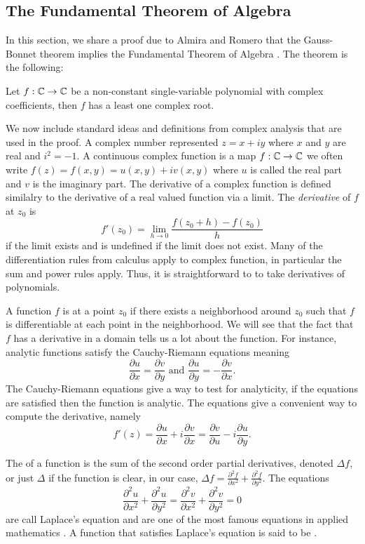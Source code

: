 \subsection{The Fundamental Theorem of Algebra}
\label{sec:fta}

In this section, we share a proof due to Almira and Romero that
the Gauss-Bonnet theorem implies the
Fundamental Theorem of Algebra \cite{almira_yet_2007}.
The theorem is the following:
\begin{theorem}\label{thm:fta}
	Let $f:\mathbb{C} \to \mathbb{C}$ be a non-constant single-variable polynomial with complex coefficients,
	then $f$ has a least one complex root.
\end{theorem}


We now include standard ideas and definitions from complex analysis that are used
in the proof. 
A complex number represented $z=x+iy$ where $x$ and $y$ are real
and $i^2=-1.$
A continuous complex function is a map $f:\mathbb{C}\to \mathbb{C}$ we often write
 $f(z)=f(x,y)=u(x,y)+iv(x,y)$ where $u$ is called the real part and $v$ is the imaginary part.
The derivative of a complex function is defined similalry to the derivative of a real valued
function via a limit. The \emph{derivative} of $f$ at $z_0$ is
$$f'(z_0)=\lim_{h\to 0} \frac{f(z_0+h)-f(z_0)}{h}$$
if the limit exists and is undefined if the limit does not exist.
Many of the differentiation rules from calculus apply to complex function,
in particular the sum and power rules apply. Thus, it is straightforward to 
to take derivatives of polynomials.


A function $f$ is  at a point $z_0$ if there exists a neighborhood around $z_0$ 
such that $f$ is differentiable at each point in the neighborhood.
We will see that the fact that $f$ has a derivative in a domain tells
us a lot about the function. For instance, analytic functions satisfy the Cauchy-Riemann 
equations meaning
$$\frac{\partial u}{\partial x}=\frac{\partial v}{\partial y} \textrm{ and } \frac{\partial u}{\partial y}=- \frac{\partial v}{\partial x}.$$
The Cauchy-Riemann equations give a way to test for analyticity, if the equations
are satisfied then the function is analytic.
The equations give a convenient way to compute the derivative, namely
$$f'(z)=\frac{\partial u}{\partial x} +i \frac{\partial v}{\partial x} =\frac{\partial v}{\partial u} -i \frac{\partial u}{\partial y}.$$


The  of a function is the sum of the second order partial derivatives, denoted $\Delta f$,
or just $\Delta$ if the function is clear,
in our case, $\Delta f=\frac{\partial^2 f}{\partial x^2}+\frac{\partial^2 f}{\partial y^2}$.
The equations $$\frac{\partial^2 u}{\partial x^2}+\frac{\partial^2 u}{\partial y^2}=
\frac{\partial^2 v}{\partial x^2}+\frac{\partial^2 v}{\partial y^2}=0$$
are call Laplace's equation and are one of the most famous equations in applied mathematics
\cite{zill_first_2008}.
A function that satisfies Laplace's equation is said to be .

